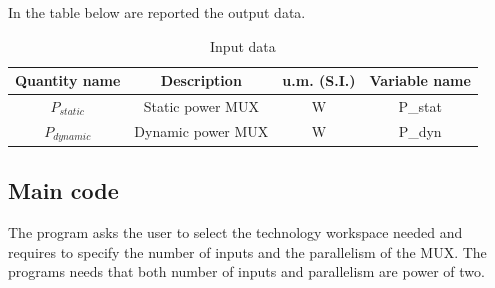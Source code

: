 In the table below are reported the output data.

\begin{table}[h]
	\begin{center}
		\begin{tabular}{|c|c|c|c|} \hline
			\textbf{Quantity name} & \textbf{Description} & \textbf{u.m. (S.I.)} & \textbf{Variable name} \\ \hline
			$P_{static}$ &Static power MUX & W & P\_stat \\ 
			$P_{dynamic}$ &Dynamic power MUX & W & P\_dyn \\ \hline 
		\end{tabular}
	\end{center}
	\caption{Input data}
	\label{tab1}
\end{table}

\subsection{Main code}
The program asks the user to select the technology workspace needed and requires to specify the number of inputs and the parallelism of the MUX. The programs needs that both number of inputs and parallelism are power of two.
		
	

